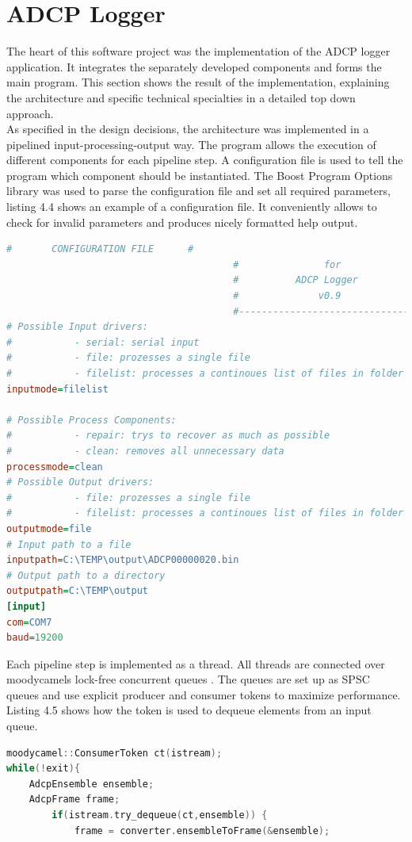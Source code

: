\section{ADCP Logger}
The heart of this software project was the implementation of the ADCP logger application. It integrates the separately developed components and forms the main program. This section shows the result of the implementation, explaining the architecture and specific technical specialties in a detailed top down approach.\\
As specified in the design decisions, the architecture was implemented in a pipelined input-processing-output way. The program allows the execution of different components for each pipeline step. A configuration file is used to tell the program which component should be instantiated. The Boost Program Options library was used to parse the configuration file and set all required parameters, listing 4.4 shows an example of a configuration file. It conveniently allows to check for invalid parameters and produces nicely formatted help output.
\begin{lstlisting}[language={Ini}, caption=A Snippet of a configuration file for the ADCP logger application.]
                                        #       CONFIGURATION FILE      #
                                        #               for             #
                                        #          ADCP Logger          #
                                        #              v0.9             #
                                        #-------------------------------#
# Possible Input drivers:
#           - serial: serial input
#           - file: prozesses a single file
#           - filelist: processes a continoues list of files in folder
inputmode=filelist

# Possible Process Components:
#           - repair: trys to recover as much as possible
#           - clean: removes all unnecessary data
processmode=clean
# Possible Output drivers:
#           - file: prozesses a single file
#           - filelist: processes a continoues list of files in folder
outputmode=file
# Input path to a file
inputpath=C:\TEMP\output\ADCP00000020.bin
# Output path to a directory
outputpath=C:\TEMP\output
[input]
com=COM7
baud=19200
\end{lstlisting}

Each pipeline step is implemented as a thread. All threads are connected over moodycamels lock-free concurrent queues \cite{moody}. The queues are set up as SPSC queues and use explicit producer and consumer tokens to maximize performance. Listing 4.5 shows how the token is used to dequeue elements from an input queue.
\begin{lstlisting}[language=C++, caption=Code snippet showing the use of consumer tokens.]
moodycamel::ConsumerToken ct(istream);
while(!exit){
    AdcpEnsemble ensemble;
    AdcpFrame frame;
        if(istream.try_dequeue(ct,ensemble)) {
            frame = converter.ensembleToFrame(&ensemble);
\end{lstlisting}

